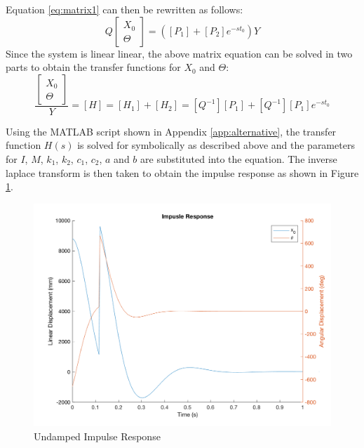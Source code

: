 \documentclass[12pt]{article}
\begin{document}
Equation \ref{eq:matrix1} can then be rewritten as follows:
\begin{equation}
	\label{eq:matrix1}
	Q
	\begin{bmatrix} 
	X_0 \\
	\Theta 
	\end{bmatrix}
	= 
	\left(\left[P_1\right]+\left[P_2\right]e^{-st_0}\right)Y
\end{equation}
Since the system is linear linear, the above matrix equation can be solved in two parts to obtain the transfer functions for $X_0$ and $\Theta$:
\begin{equation}
	\frac{\begin{bmatrix} 
		X_0 \\
		\Theta 
	\end{bmatrix}}{Y} =
	\left[H\right] = 
	\left[H_1\right] + \left[H_2\right] = 
	[Q^{-1}][P_1] + [Q^{-1}][P_1]e^{-st_0} 
\end{equation} 

Using the MATLAB script shown in Appendix \ref{app:alternative}, the transfer function $H(s)$ is solved for symbolically as described above and the parameters for $I$, $M$, $k_1$, $k_2$, $c_1$, $c_2$, $a$ and $b$ are substituted into the equation. The inverse laplace transform is then taken to obtain the impulse response as shown in Figure \ref{fig:impResp}.
\begin{figure}[h!]
	\centering
	\includegraphics[width=.8\textwidth]{./matlab/impResp.png}
	\caption{Undamped Impulse Response}
	\label{fig:impResp}
\end{figure}
\end{document}
